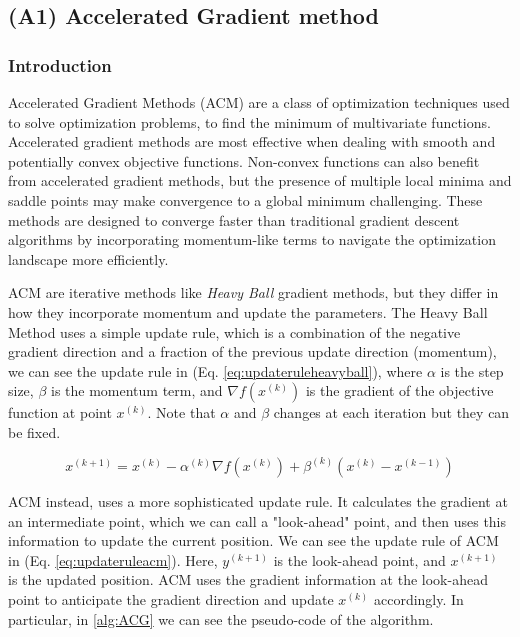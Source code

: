 \subsection{(A1) Accelerated Gradient method}

\subsubsection{Introduction}

Accelerated Gradient Methods (ACM) are a class of optimization techniques used to solve optimization problems, to find the minimum of multivariate functions. 
Accelerated gradient methods are most effective when dealing with smooth and potentially convex objective functions.
Non-convex functions can also benefit from accelerated gradient methods, but the presence of multiple local minima and saddle points may make convergence to a global minimum challenging.
These methods are designed to converge faster than traditional gradient descent algorithms by incorporating momentum-like terms to navigate the optimization landscape more efficiently.

ACM are iterative methods like \textit{Heavy Ball} \cite{heavyball} gradient methods, but they differ in how they incorporate momentum and update the parameters.
The Heavy Ball Method uses a simple update rule, which is a combination of the negative gradient direction and a fraction of the previous update direction (momentum), we can see the update rule in (Eq. \ref{eq:updateruleheavyball}), where $\alpha$ is the step size, $\beta$ is the momentum term, and $\nabla f(x^{(k)})$ is the gradient of the objective function at point $x^{(k)}$. Note that $\alpha$ and $\beta$ changes at each iteration but they can be fixed.

\begin{equation}
    \label{eq:updateruleheavyball}
    x^{(k+1)} = 
    x^{(k)} - \alpha^{(k)} \nabla f(x^{(k)}) + \beta^{(k)}(x^{(k)} - x^{(k-1)})
\end{equation}


ACM instead, uses a more sophisticated update rule. It calculates the gradient at an intermediate point, which we can call a "look-ahead" point, and then uses this information to update the current position. 
We can see the update rule of ACM in (Eq. \ref{eq:updateruleacm}). 
Here, $y^{(k+1)}$ is the look-ahead point, and $x^{(k+1)}$ is the updated position. ACM uses the gradient information at the look-ahead point to anticipate the gradient direction and update $x^{(k)}$ accordingly. In particular, in \ref{alg:ACG} we can see the pseudo-code of the algorithm. 

